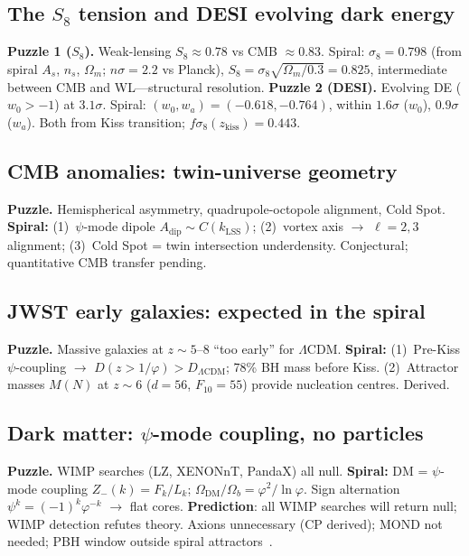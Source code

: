 \documentclass[12pt,a4paper]{article}
\begin{document}
\subsection{The $S_8$ tension and DESI evolving dark energy}
\label{sec:s8-desi}

\noindent\textbf{Puzzle 1 ($S_8$).}\; Weak-lensing $S_8 \approx 0.78$ vs CMB $\approx 0.83$. Spiral: $\sigma_8 = 0.798$ (from spiral $A_s$, $n_s$, $\Omega_m$; $n\sigma = 2.2$ vs Planck), $S_8 = \sigma_8\sqrt{\Omega_m/0.3} = 0.825$, intermediate between CMB and WL---structural resolution. \textbf{Puzzle 2 (DESI).}\; Evolving DE ($w_0 > -1$) at $3.1\sigma$. Spiral: $(w_0, w_a) = (-0.618, -0.764)$, within $1.6\sigma$ ($w_0$), $0.9\sigma$ ($w_a$). Both from Kiss transition; $f\sigma_8(z_{\mathrm{kiss}}) = 0.443$.

\subsection{CMB anomalies: twin-universe geometry}
\label{sec:cmb-anomalies}

\noindent\textbf{Puzzle.}\; Hemispherical asymmetry, quadrupole-octopole alignment, Cold Spot. \textbf{Spiral:} (1)~$\psi$-mode dipole $A_{\mathrm{dip}} \sim C(k_{\mathrm{LSS}})$; (2)~vortex axis $\to$ $\ell=2,3$ alignment; (3)~Cold Spot = twin intersection underdensity. Conjectural; quantitative CMB transfer pending.

\subsection{JWST early galaxies: expected in the spiral}
\label{sec:jwst}

\noindent\textbf{Puzzle.}\; Massive galaxies at $z \sim 5$--$8$ ``too early'' for $\Lambda$CDM. \textbf{Spiral:} (1)~Pre-Kiss $\psi$-coupling $\to$ $D(z > 1/\varphi) > D_{\Lambda\mathrm{CDM}}$; 78\% BH mass before Kiss. (2)~Attractor masses $M(N)$ at $z \sim 6$ ($d{=}56$, $F_{10}{=}55$) provide nucleation centres. Derived.

\subsection{Dark matter: $\psi$-mode coupling, no particles}
\label{sec:dm-null}

\noindent\textbf{Puzzle.}\; WIMP searches (LZ, XENONnT, PandaX) all null. \textbf{Spiral:} DM = $\psi$-mode coupling $Z_-(k) = F_k/L_k$; $\Omega_{\mathrm{DM}}/\Omega_b = \varphi^2/\ln\varphi$. Sign alternation $\psi^k = (-1)^k\varphi^{-k}$ $\to$ flat cores. \textbf{Prediction}: all WIMP searches will return null; WIMP detection refutes theory. Axions unnecessary (CP derived); MOND not needed; PBH window outside spiral attractors~\cite{Peccei1977,Weinberg1978,Wilczek1978,Milgrom1983}.
\end{document}
